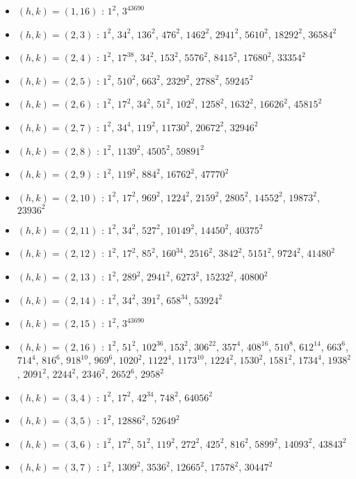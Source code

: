 \begin{itemize}
\item $(h,k)=(1,16)$ : $1^{2}$, $3^{43690}$
\item $(h,k)=(2,3)$ : $1^{2}$, $34^{2}$, $136^{2}$, $476^{2}$, $1462^{2}$, $2941^{2}$, $5610^{2}$, $18292^{2}$, $36584^{2}$
\item $(h,k)=(2,4)$ : $1^{2}$, $17^{38}$, $34^{2}$, $153^{2}$, $5576^{2}$, $8415^{2}$, $17680^{2}$, $33354^{2}$
\item $(h,k)=(2,5)$ : $1^{2}$, $510^{2}$, $663^{2}$, $2329^{2}$, $2788^{2}$, $59245^{2}$
\item $(h,k)=(2,6)$ : $1^{2}$, $17^{2}$, $34^{2}$, $51^{2}$, $102^{2}$, $1258^{2}$, $1632^{2}$, $16626^{2}$, $45815^{2}$
\item $(h,k)=(2,7)$ : $1^{2}$, $34^{4}$, $119^{2}$, $11730^{2}$, $20672^{2}$, $32946^{2}$
\item $(h,k)=(2,8)$ : $1^{2}$, $1139^{2}$, $4505^{2}$, $59891^{2}$
\item $(h,k)=(2,9)$ : $1^{2}$, $119^{2}$, $884^{2}$, $16762^{2}$, $47770^{2}$
\item $(h,k)=(2,10)$ : $1^{2}$, $17^{2}$, $969^{2}$, $1224^{2}$, $2159^{2}$, $2805^{2}$, $14552^{2}$, $19873^{2}$, $23936^{2}$
\item $(h,k)=(2,11)$ : $1^{2}$, $34^{2}$, $527^{2}$, $10149^{2}$, $14450^{2}$, $40375^{2}$
\item $(h,k)=(2,12)$ : $1^{2}$, $17^{2}$, $85^{2}$, $160^{34}$, $2516^{2}$, $3842^{2}$, $5151^{2}$, $9724^{2}$, $41480^{2}$
\item $(h,k)=(2,13)$ : $1^{2}$, $289^{2}$, $2941^{2}$, $6273^{2}$, $15232^{2}$, $40800^{2}$
\item $(h,k)=(2,14)$ : $1^{2}$, $34^{2}$, $391^{2}$, $658^{34}$, $53924^{2}$
\item $(h,k)=(2,15)$ : $1^{2}$, $3^{43690}$
\item $(h,k)=(2,16)$ : $1^{2}$, $51^{2}$, $102^{36}$, $153^{2}$, $306^{22}$, $357^{4}$, $408^{16}$, $510^{8}$, $612^{14}$, $663^{6}$, $714^{4}$, $816^{6}$, $918^{10}$, $969^{6}$, $1020^{2}$, $1122^{4}$, $1173^{10}$, $1224^{2}$, $1530^{2}$, $1581^{2}$, $1734^{4}$, $1938^{2}$, $2091^{2}$, $2244^{2}$, $2346^{2}$, $2652^{6}$, $2958^{2}$
\item $(h,k)=(3,4)$ : $1^{2}$, $17^{2}$, $42^{34}$, $748^{2}$, $64056^{2}$
\item $(h,k)=(3,5)$ : $1^{2}$, $12886^{2}$, $52649^{2}$
\item $(h,k)=(3,6)$ : $1^{2}$, $17^{2}$, $51^{2}$, $119^{2}$, $272^{2}$, $425^{2}$, $816^{2}$, $5899^{2}$, $14093^{2}$, $43843^{2}$
\item $(h,k)=(3,7)$ : $1^{2}$, $1309^{2}$, $3536^{2}$, $12665^{2}$, $17578^{2}$, $30447^{2}$

\end{itemize}
